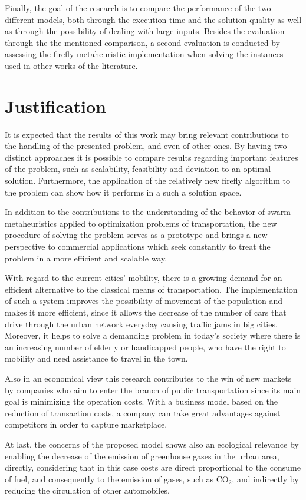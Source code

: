 \documentclass[tuberlin,cic,tc,openright,english,noabntcite,oneside]{iiufrgs}
\begin{document}
Finally, the goal of the research is to compare the performance of the two different models, both through the execution time and the solution quality as well as through the possibility of dealing with large inputs. Besides the evaluation through the the mentioned comparison, a second evaluation is conducted by assessing the firefly metaheuristic implementation when solving the instances used in other works of the literature.

\section{Justification}
It is expected that the results of this work may bring relevant contributions to the handling of the presented problem, and even of other ones. By having two distinct approaches it is possible to compare results regarding important features of the problem, such as scalability, feasibility and deviation to an optimal solution. Furthermore, the application of the relatively new firefly algorithm to the problem can show how it performs in a such a solution space.

In addition to the contributions to the understanding of the behavior of swarm metaheuristics applied to optimization problems of transportation, the new procedure of solving the problem serves as a prototype and brings a new perspective to commercial applications which seek constantly to treat the problem in a more efficient and scalable way.

With regard to the current cities' mobility, there is a growing demand for an efficient alternative to the classical means of transportation. The implementation of such a system improves the possibility of movement of the population and makes it more efficient, since it allows the decrease of the number of cars that drive through the urban network everyday causing traffic jams in big cities. Moreover, it helps to solve a demanding problem in today's society where there is an increasing number of elderly or handicapped people, who have the right to mobility and need assistance to travel in the town.

Also in an economical view this research contributes to the win of new markets by companies who aim to enter the branch of public transportation since its main goal is minimizing the operation costs. With a business model based on the reduction of transaction costs, a company can take great advantages against competitors in order to capture marketplace.

At last, the concerns of the proposed model shows also an ecological relevance by enabling the decrease of the emission of greenhouse gases in the urban area, directly, considering that in this case costs are direct proportional to the consume of fuel, and consequently to the emission of gases, such as CO$_{2}$, and indirectly by reducing the circulation of other automobiles.
\end{document}
